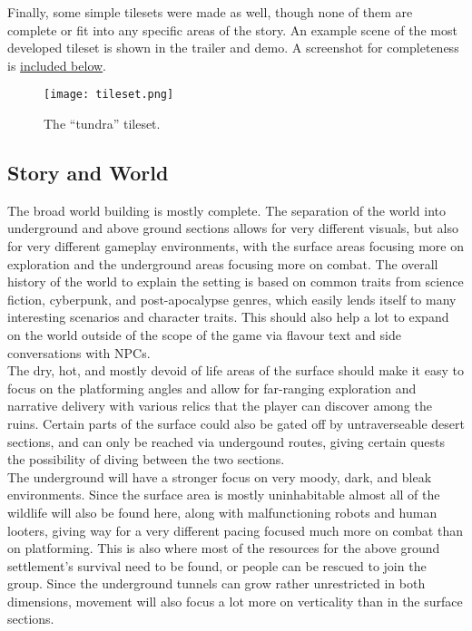 Finally, some simple tilesets were made as well, though none of them are complete or fit into any specific areas of the story. An example scene of the most developed tileset is shown in the trailer and demo. A screenshot for completeness is \hyperref[fig:tileset]{included below}.

\begin{figure}[H]
  \centering
  \texttt{[image: tileset.png]}
  \label{fig:tileset}
  \caption{The ``tundra'' tileset.}
\end{figure}

\subsection{Story and World}
The broad world building is mostly complete. The separation of the world into underground and above ground sections allows for very different visuals, but also for very different gameplay environments, with the surface areas focusing more on exploration and the underground areas focusing more on combat. The overall history of the world to explain the setting is based on common traits from science fiction, cyberpunk, and post-apocalypse genres, which easily lends itself to many interesting scenarios and character traits. This should also help a lot to expand on the world outside of the scope of the game via flavour text and side conversations with NPCs. \\

The dry, hot, and mostly devoid of life areas of the surface should make it easy to focus on the platforming angles and allow for far-ranging exploration and narrative delivery with various relics that the player can discover among the ruins. Certain parts of the surface could also be gated off by untraverseable desert sections, and can only be reached via undergound routes, giving certain quests the possibility of diving between the two sections. \\

The underground will have a stronger focus on very moody, dark, and bleak environments. Since the surface area is mostly uninhabitable almost all of the wildlife will also be found here, along with malfunctioning robots and human looters, giving way for a very different pacing focused much more on combat than on platforming. This is also where most of the resources for the above ground settlement's survival need to be found, or people can be rescued to join the group. Since the underground tunnels can grow rather unrestricted in both dimensions, movement will also focus a lot more on verticality than in the surface sections. \\

